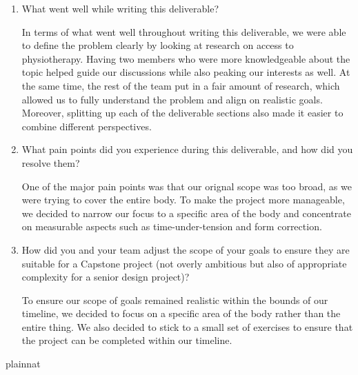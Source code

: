 \documentclass{article}
\begin{document}
\begin{enumerate}
    \item What went well while writing this deliverable? 

    In terms of what went well throughout writing this deliverable, we were able to define the problem 
    clearly by looking at research on access to physiotherapy. Having two members who were more knowledgeable 
    about the topic helped guide our discussions while also peaking our interests as well. At the same time, the 
    rest of the team put in a fair amount of research, which allowed us to fully understand the problem and align 
    on realistic goals. Moreover, splitting up each of the deliverable sections also made it easier to combine 
    different perspectives.

    \item What pain points did you experience during this deliverable, and how
    did you resolve them?

    One of the major pain points was that our orignal scope was too broad, as we were trying to cover the entire body. To 
    make the project more manageable, we decided to narrow our focus to a specific area of the body and concentrate on
    measurable aspects such as time-under-tension and form correction.

    \item How did you and your team adjust the scope of your goals to ensure
    they are suitable for a Capstone project (not overly ambitious but also of
    appropriate complexity for a senior design project)?

    To ensure our scope of goals remained realistic within the bounds of our timeline, we decided to focus on a specific area 
    of the body rather than the entire thing. We also decided to stick to a small set of exercises to ensure that the project
    can be completed within our timeline.
\end{enumerate}  

 {plainnat}

\end{document}

